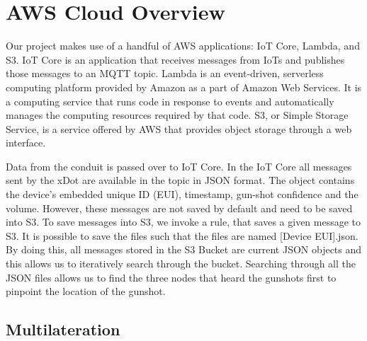 \documentclass[conference]{IEEEtran}
\begin{document}
\section{AWS Cloud Overview}

Our project makes use of a handful of AWS applications: IoT Core, Lambda, and S3. IoT Core is an application that receives messages from IoTs and publishes those messages to an MQTT topic. Lambda is an event-driven, serverless computing platform provided by Amazon as a part of Amazon Web Services. It is a computing service that runs code in response to events and automatically manages the computing resources required by that code. S3, or Simple Storage Service, is a service offered by AWS that provides object storage through a web interface.

Data from the conduit is passed over to IoT Core. In the IoT Core all messages sent by the xDot are available in the topic in JSON format. The object contains the device’s embedded unique ID (EUI), timestamp, gun-shot confidence and the volume. However, these messages are not saved by default and need to be saved into S3. To save messages into S3, we invoke a rule, that saves a given message to S3. It is possible to save the files such that the files are named [Device EUI].json. By doing this, all messages stored in the S3 Bucket are current JSON objects and this allows us to iteratively search through the bucket. Searching through all the JSON files allows us to find the three nodes that heard the gunshots first to pinpoint the location of the gunshot.

\subsection {Multilateration}
\end{document}
